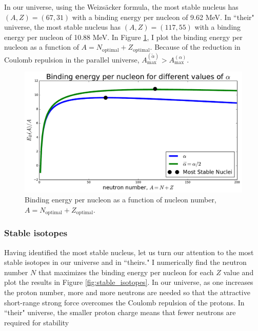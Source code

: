 \documentclass[%
 reprint,
 amsmath,amssymb,
 aps,
]{revtex4-1}
\begin{document}
In our universe, using the Weizs\"acker formula, the most stable nucleus has $(A, Z) = (67, 31)$ with a binding energy per nucleon of 9.62 MeV. In ``their" universe, the most stable nucleus has $(A, Z) = (117, 55)$ with a binding energy per nucleon of 10.88 MeV. In Figure \ref{fig:binding_energy}, I plot the binding energy per nucleon as a function of $A = N_\text{optimal} + Z_\text{optimal}$. Because of the reduction in Coulomb repulsion in the parallel universe, $A_\text{max}^{(\widetilde{\alpha})} > A_\text{max}^{(\alpha)}$.

\begin{figure}[h!]
	\centering
	\includegraphics[width=\linewidth]{fig/binding_energy.pdf}
	\caption{\label{fig:binding_energy}Binding energy per nucleon as a function of nucleon number, $A = N_\text{optimal} + Z_\text{optimal}$.}
\end{figure}

\subsubsection{\label{sec:stable_isotopes}Stable isotopes}

Having identified the most stable nucleus, let us turn our attention to the most stable isotopes in our universe and in ``theirs." I numerically find the neutron number $N$ that maximizes the binding energy per nucleon for each $Z$ value\cite{jupyter_notebook} and plot the results in Figure \ref{fig:stable_isotopes}. In our universe, as one increases the proton number, more and more neutrons are needed so that the attractive short-range strong force overcomes the Coulomb repulsion of the protons. In ``their" universe, the smaller proton charge means that fewer neutrons are required for stability
\end{document}
